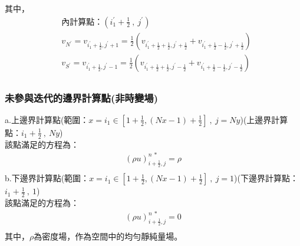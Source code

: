 \documentclass[12pt]{article}
\begin{document}
\noindent 其中，
\begin{equation*}\begin{split}
    &\text{內計算點：}(i_{1}^{\prime}+\frac{1}{2}\ ,\ j^{\prime})\\[1.5ex]
    &v_{N^{\prime}} = v_{i_{1}^{\prime}+\frac{1}{2},j^{\prime}+1} = \frac{1}{2}(v_{i_{1}^{\prime}+\frac{1}{2}+\frac{1}{2},j^{\prime}+\frac{1}{2}} + v_{i_{1}^{\prime}+\frac{1}{2}-\frac{1}{2},j^{\prime}+\frac{1}{2}})\\[1.5ex]
    &v_{S^{\prime}} = v_{i_{1}^{\prime}+\frac{1}{2},j^{\prime}-1} = \frac{1}{2}(v_{i_{1}^{\prime}+\frac{1}{2}+\frac{1}{2},j^{\prime}-\frac{1}{2}} + v_{i_{1}^{\prime}+\frac{1}{2}-\frac{1}{2},j^{\prime}-\frac{1}{2}})\\[1.5ex]
\end{split}\end{equation*}
\subsubsection{未參與迭代的邊界計算點(非時變場)}
\noindent a.上邊界計算點(範圍：$x = i_{1} \in [1+\frac{1}{2},(Nx-1)+\frac{1}{2}]\ ,\ j = Ny$)(上邊界計算點：$i_{1}+\frac{1}{2}\ ,\ Ny$)\\[1.5ex]
\noindent 該點滿足的方程為：
\begin{equation}\begin{split}
    (\rho u)_{i+\frac{1}{2},j}^{n\ *} = \rho \\[1.5ex]
\end{split}\end{equation}
\noindent b.下邊界計算點(範圍：$x = i_{1} \in [1+\frac{1}{2},(Nx-1)+\frac{1}{2}]\ ,\ j = 1$)(下邊界計算點：$i_{1}+\frac{1}{2}\ ,\ 1$)\\[1.5ex]
\noindent 該點滿足的方程為：
\begin{equation}\begin{split}
    (\rho u)_{i+\frac{1}{2},j}^{n\ *} = 0\\[1.5ex]
\end{split}\end{equation}
\noindent 其中，$\rho$為密度場，作為空間中的均勻靜純量場。
\end{document}

